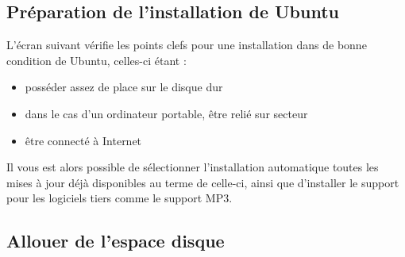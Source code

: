 \subsection{Préparation de l'installation de Ubuntu}
L'écran suivant vérifie les points clefs pour une installation dans de bonne condition de Ubuntu, celles-ci étant :
\begin{itemize}
\item posséder assez de place sur le disque dur
\item dans le cas d'un ordinateur portable, être relié sur secteur
\item être connecté à Internet
\end{itemize}
Il vous est alors possible de sélectionner l'installation automatique toutes les mises à jour déjà disponibles au terme de celle-ci, ainsi que d'installer le support pour les logiciels tiers comme le support MP3.
\subsection{Allouer de l'espace disque}
\label{RefFormatPartition}
